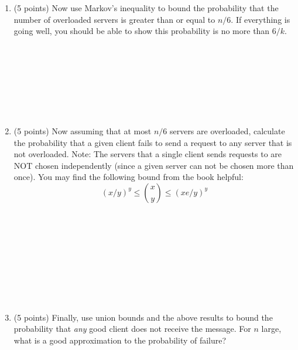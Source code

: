 \documentclass[11pt]{article}
\newcommand{\ans}[1]{ }
\begin{document}
\begin{enumerate}
\begin{enumerate}
\item (5 points) Now use Markov's inequality to bound the probability that the number of overloaded servers is greater than or equal to $n/6$.  If everything is going well, you should be able to show this probability is no more than $6/k$.
\ans{Let $X$ be the number of overloaded servers.  By Markov's, $Pr(X \geq \lambda) \leq E(X)/\lambda$, which means $Pr(X \geq n/6) \leq (n/k)/(n/6) = 6/k$.} \\ \ \\ \ \\ \ \\ \ \\ \ \\ \ \\ \ \\


\pagebreak

\item (5 points) Now assuming that at most $n/6$ servers are overloaded, calculate the probability that a given client fails to send a request to any server that is not overloaded.  Note: The servers that a single client sends requests to are NOT chosen independently (since a given server can not be chosen more than once).  You may find the following bound from the book helpful: 
$$ (x/y)^{y} \leq {x \choose y} \leq (xe/y)^{y}$$

\ans{The probability of sending every request to a processor that is overloaded is ${n/2 \choose \sqrt{n}} / {n \choose \sqrt{n}}$.  Using the above inequality, this probability is no more than $(e/6)^{\sqrt{n}} \leq (1/2)^{\sqrt{n}}$} \ \\ \ \\ \ \\ \ \\ \ \\ \ \\ \ \\ \ \\

\pagebreak

\item (5 points) Finally, use union bounds and the above results to bound the probability that \emph{any} good client does not receive the message.  For $n$ large, what is a good approximation to the probability of failure?

\ans{The probability of failure is at most $6/k + n*(1/2)^{\sqrt{n}}$.  Since $n = 2^{log n}$, we have $6/k + 2^{\log n - \sqrt{n}}$.  For $n$ large, $6/k$ is a good approximation to the probability of failure.}



\end{enumerate}


 
 
 
 
\end{enumerate}
\end{document}
